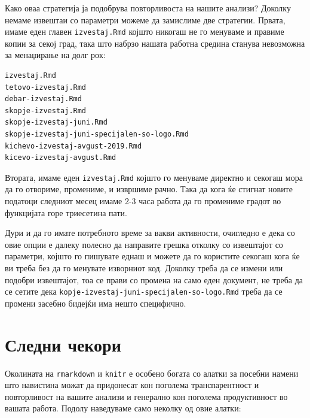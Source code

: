 \documentclass[
]{book}
\begin{document}
Како оваа стратегија ја подобрува повторливоста на нашите анализи? Доколку немаме извештаи со параметри можеме да замислиме две стратегии. Првата, имаме еден главен \texttt{izvestaj.Rmd} којшто никогаш не го менуваме и правиме копии за секој град, така што набрзо нашата работна средина станува невозможна за менаџирање на долг рок:

\begin{verbatim}
izvestaj.Rmd
tetovo-izvestaj.Rmd
debar-izvestaj.Rmd
skopje-izvestaj.Rmd
skopje-izvestaj-juni.Rmd
skopje-izvestaj-juni-specijalen-so-logo.Rmd
kichevo-izvestaj-avgust-2019.Rmd
kicevo-izvestaj-avgust.Rmd
\end{verbatim}

Втората, имаме еден \texttt{izvestaj.Rmd} којшто го менуваме директно и секогаш мора да го отвориме, промениме, и извршиме рачно. Така да кога ќе стигнат новите податоци следниот месец имаме 2-3 часа работа да го промениме градот во функцијата горе триесетина пати.

Дури и да го имате потребното време за вакви активности, очигледно е дека со овие опции е далеку полесно да направите грешка отколку со извештајот со параметри, којшто го пишувате еднаш и можете да го користите секогаш кога ќе ви треба без да го менувате изворниот код. Доколку треба да се измени или подобри извештајот, тоа се прави со промена на само еден документ, не треба да се сетите дека \texttt{kopje-izvestaj-juni-specijalen-so-logo.Rmd} треба да се промени засебно бидејќи има нешто специфично.

\hypertarget{ux441ux43bux435ux434ux43dux438-ux447ux435ux43aux43eux440ux438}{%
\section{Следни чекори}\label{ux441ux43bux435ux434ux43dux438-ux447ux435ux43aux43eux440ux438}}

Околината на \texttt{rmarkdown} и \texttt{knitr} е особено богата со алатки за посебни намени што навистина можат да придонесат кон поголема транспарентност и повторливост на вашите анализи и генерално кон поголема продуктивност во вашата работа. Подолу наведуваме само неколку од овие алатки:
\end{document}
